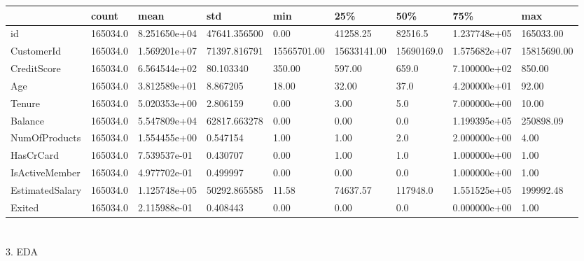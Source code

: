\documentclass[
  letterpaper,
  DIV=11,
  numbers=noendperiod]{scrartcl}
\begin{document}
\begin{longtable}[]{@{}lllllllll@{}}
\toprule\noalign{}
& count & mean & std & min & 25\% & 50\% & 75\% & max \\
\midrule\noalign{}
\endhead
\bottomrule\noalign{}
\endlastfoot
id & 165034.0 & 8.251650e+04 & 47641.356500 & 0.00 & 41258.25 & 82516.5
& 1.237748e+05 & 165033.00 \\
CustomerId & 165034.0 & 1.569201e+07 & 71397.816791 & 15565701.00 &
15633141.00 & 15690169.0 & 1.575682e+07 & 15815690.00 \\
CreditScore & 165034.0 & 6.564544e+02 & 80.103340 & 350.00 & 597.00 &
659.0 & 7.100000e+02 & 850.00 \\
Age & 165034.0 & 3.812589e+01 & 8.867205 & 18.00 & 32.00 & 37.0 &
4.200000e+01 & 92.00 \\
Tenure & 165034.0 & 5.020353e+00 & 2.806159 & 0.00 & 3.00 & 5.0 &
7.000000e+00 & 10.00 \\
Balance & 165034.0 & 5.547809e+04 & 62817.663278 & 0.00 & 0.00 & 0.0 &
1.199395e+05 & 250898.09 \\
NumOfProducts & 165034.0 & 1.554455e+00 & 0.547154 & 1.00 & 1.00 & 2.0 &
2.000000e+00 & 4.00 \\
HasCrCard & 165034.0 & 7.539537e-01 & 0.430707 & 0.00 & 1.00 & 1.0 &
1.000000e+00 & 1.00 \\
IsActiveMember & 165034.0 & 4.977702e-01 & 0.499997 & 0.00 & 0.00 & 0.0
& 1.000000e+00 & 1.00 \\
EstimatedSalary & 165034.0 & 1.125748e+05 & 50292.865585 & 11.58 &
74637.57 & 117948.0 & 1.551525e+05 & 199992.48 \\
Exited & 165034.0 & 2.115988e-01 & 0.408443 & 0.00 & 0.00 & 0.0 &
0.000000e+00 & 1.00 \\
\end{longtable}

\hypertarget{section-4}{%
\section{}\label{section-4}}

3. EDA
\end{document}
